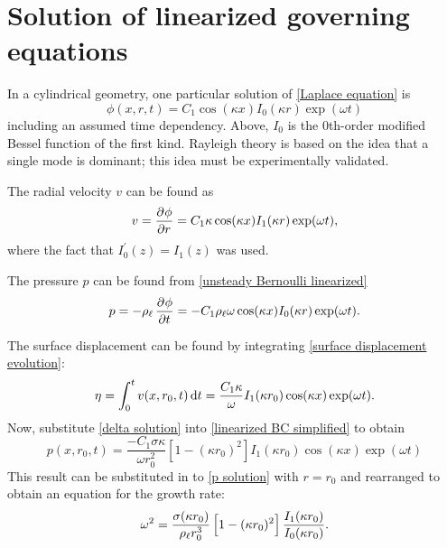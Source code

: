 \section{Solution of linearized governing equations}

In a cylindrical geometry, one particular solution of \eqref{Laplace equation} is
\begin{equation}
   \phi(x, r, t) = C_1 \cos(\kappa x) I_0(\kappa r) \exp(\omega t)
\end{equation}
including an assumed time dependency. Above, $I_0$ is the $0$th-order modified Bessel function of the first kind. Rayleigh theory is based on the idea that a single mode is dominant; this idea must be experimentally validated.

The radial velocity $v$ can be found as
\begin{equation}
   v = \dpd{\phi}{r} = C_1 \kappa \cos(\kappa x) I_1(\kappa r) \exp(\omega t),
\end{equation}
where the fact that $I_0^\prime(z) = I_1(z)$ was used.

The pressure $p$ can be found from \eqref{unsteady Bernoulli linearized}
\begin{equation}
   p = -\rhol \dpd{\phi}{t} = -C_1 \rhol \omega \cos(\kappa x) I_0(\kappa r) \exp(\omega t). \label{eqn:p solution}
\end{equation}

The surface displacement can be found by integrating \eqref{surface displacement evolution}:
\begin{equation}
   \eta = \int_0^t v(x, r_0, t) \dif t = \frac{C_1 \kappa}{\omega} I_1(\kappa r_0) \cos(\kappa x) \exp(\omega t). \label{eqn:delta solution}
\end{equation}
Now, substitute \eqref{delta solution} into \eqref{linearized BC simplified} to obtain
\begin{equation}
   p(x, r_0, t) = \frac{-C_1 \sigma \kappa}{\omega r_0^2} \left[1 - (\kappa r_0)^2\right] I_1(\kappa r_0) \cos(\kappa x) \exp(\omega t)
\end{equation}
This result can be substituted in to \eqref{p solution} with $r = r_0$ and rearranged to obtain an equation for the growth rate:
\begin{equation}
   \omega^2 = \frac{\sigma (\kappa r_0)}{\rho_{\ell} r_0^3} \left[1 - (\kappa r_0)^2\right] \frac{I_1(\kappa r_0)}{I_0(\kappa r_0)}. \label{eqn:Rayleigh growth rate exact}
\end{equation}

